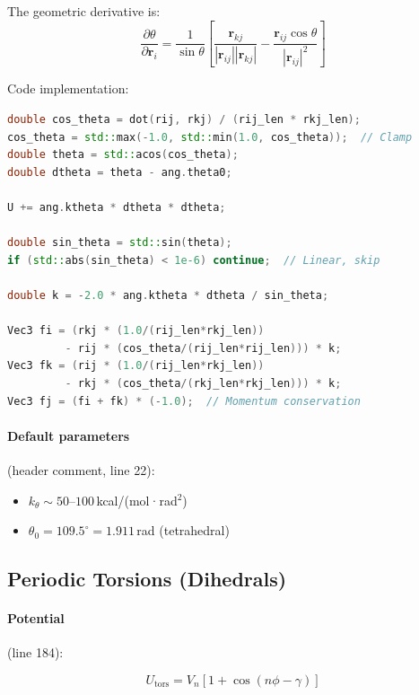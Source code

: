 \documentclass[11pt]{article}
\begin{document}
The geometric derivative is:
\begin{equation}
\frac{\partial\theta}{\partial\mathbf{r}_i} = \frac{1}{\sin\theta}\left[\frac{\mathbf{r}_{kj}}{|\mathbf{r}_{ij}||\mathbf{r}_{kj}|} - \frac{\mathbf{r}_{ij}\cos\theta}{|\mathbf{r}_{ij}|^2}\right]
\end{equation}

Code implementation:

\begin{lstlisting}[language=C++]
double cos_theta = dot(rij, rkj) / (rij_len * rkj_len);
cos_theta = std::max(-1.0, std::min(1.0, cos_theta));  // Clamp
double theta = std::acos(cos_theta);
double dtheta = theta - ang.theta0;

U += ang.ktheta * dtheta * dtheta;

double sin_theta = std::sin(theta);
if (std::abs(sin_theta) < 1e-6) continue;  // Linear, skip

double k = -2.0 * ang.ktheta * dtheta / sin_theta;

Vec3 fi = (rkj * (1.0/(rij_len*rkj_len)) 
         - rij * (cos_theta/(rij_len*rij_len))) * k;
Vec3 fk = (rij * (1.0/(rij_len*rkj_len)) 
         - rkj * (cos_theta/(rkj_len*rkj_len))) * k;
Vec3 fj = (fi + fk) * (-1.0);  // Momentum conservation
\end{lstlisting}

\paragraph{Default parameters} (header comment, line 22):
\begin{itemize}
\item $k_\theta \sim 50$--$100$\,kcal/(mol·rad$^2$)
\item $\theta_0 = 109.5^\circ = 1.911$\,rad (tetrahedral)
\end{itemize}

\subsection{Periodic Torsions (Dihedrals)}

\paragraph{Potential} (line 184):

\begin{equation}
U_{\text{tors}} = V_n[1 + \cos(n\phi - \gamma)]
\end{equation}
\end{document}
